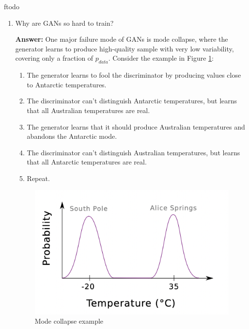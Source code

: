 ƒtodo\documentclass{article}
\newenvironment{QandA}{\begin{enumerate}[label=\arabic*.]}{\end{enumerate}}
\newenvironment{InnerQandA}{\begin{enumerate}[label=\roman*.]}{\end{enumerate}}
\newenvironment{answer}{\par\normalfont \textbf{Answer:}}{}
\newcommand{\KL}[2]{\text{KL}\left[#1 \Vert #2 \right]}
\begin{document}
\begin{QandA}
\begin{InnerQandA}
\begin{answer}
\begin{align*}
                &= -\log 4 + \KL{p_{data}}{\frac{p_{data} + p_{model}}{2}} + \KL{p_{model}}{\frac{p_{data} + p_{model}}{2}} \\
                &= -\log 4 + \text{JSD}\left[  p_{data}, p_{model} \right]
            \end{align*}
            where JSD is the Jenson Shannon Divergence. Since this is a non-negative quantity, when $G$ tries to minimize $V(G, D^*_G)$ it will push $\text{JSD}\left[  p_{data}, p_{model}\right]$ down to 0, which is achieved for $p_{model} = p_{data}$. In turn, this implies:
            \begin{align*}
                D^*_{G}(x) &= \frac{p_{data}(x)}{p_{data}(x) + p_{model}(x)} \underbrace{=}_{p_{model} = p_{data}} = \frac{1}{2} \\
                V(G*, D^*_G) &= -\log 4 + \text{JSD}\left[  p_{data}, p_{model} \right] \underbrace{=}_{p_{model} = p_{data}} -\log4
            \end{align*}
        \end{answer}

        \item Why are GANs so hard to train?
        \begin{answer}
            One major failure mode of GANs is mode collapse, where the generator learns to produce high-quality sample with very low variability, covering only a fraction of $p_{data}$. Consider the example in Figure \ref{fig:mode-collapse}:
            \begin{enumerate}[label=\arabic*.]
                \item The generator learns to fool the discriminator by producing values close to Antarctic temperatures. 
                \item The discriminator can't distinguish Antarctic temperatures, but learns that all Australian temperatures are real.
                \item The generator learns that it should produce Australian temperatures and abandons the Antarctic mode. 
                \item The discriminator can't distinguish Australian temperatures, but learns that all Antarctic temperatures are real. 
                \item Repeat.
            \end{enumerate}
            \begin{figure}[h!]
                \centering
                \includegraphics[width=0.5\linewidth]{img/mode-collapse.png}
                \caption{Mode collapse example}
                \label{fig:mode-collapse}
            \end{figure}


\end{answer}
\end{InnerQandA}
\end{QandA}
\end{document}
